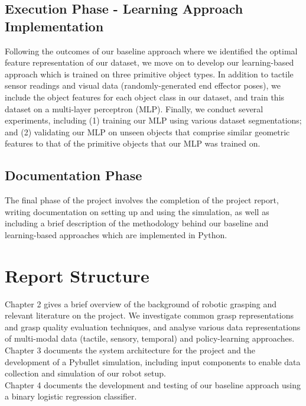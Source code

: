 \documentclass[11pt, a4paper]{report}
\begin{document}
\subsection{Execution Phase - Learning Approach Implementation}\label{sec:1.4.4}
Following the outcomes of our baseline approach where we identified the optimal feature representation of our dataset, we move on to develop our learning-based approach which is trained on three primitive object types. In addition to tactile sensor readings and visual data (randomly-generated end effector poses), we include the object features for each object class in our dataset, and train this dataset on a multi-layer perceptron (MLP). Finally, we conduct several experiments, including (1) training our MLP using various dataset segmentations; and (2) validating our MLP on unseen objects that comprise similar geometric features to that of the primitive objects that our MLP was trained on.


\subsection{Documentation Phase}\label{sec:1.4.5}
The final phase of the project involves the completion of the project report, writing documentation on setting up and using the simulation, as well as including a brief description of the methodology behind our baseline and learning-based approaches which are implemented in Python.


\section{Report Structure}\label{sec:1.5}
Chapter 2 gives a brief overview of the background of robotic grasping and relevant literature on the project. We investigate common grasp representations and grasp quality evaluation techniques, and analyse various data representations of multi-modal data (tactile, sensory, temporal) and policy-learning approaches.\\

Chapter 3 documents the system architecture for the project and the development of a Pybullet simulation, including input components to enable data collection and simulation of our robot setup.\\

Chapter 4 documents the development and testing of our baseline approach using a binary logistic regression classifier.\\
\end{document}
